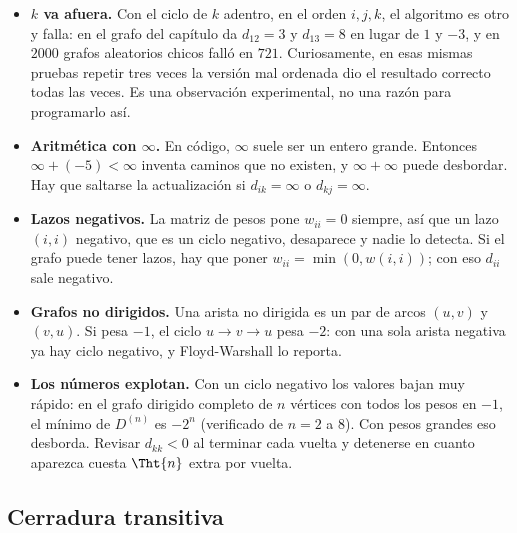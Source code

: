 \documentclass[11pt,letterpaper]{article}
\begin{document}
\begin{ojo}[breakable]
  \begin{itemize}[itemsep=0.2em, leftmargin=1.2em]
    \item \textbf{$k$ va afuera.} Con el ciclo de $k$ adentro, en el
          orden $i, j, k$, el algoritmo es otro y falla: en el grafo
          del capítulo da $d_{12} = 3$ y $d_{13} = 8$ en lugar de $1$
          y $-3$, y en $2000$ grafos aleatorios chicos falló en $721$.
          Curiosamente, en esas mismas pruebas repetir tres veces la
          versión mal ordenada dio el resultado correcto todas las
          veces. Es una observación experimental, no una razón para
          programarlo así.
    \item \textbf{Aritmética con $\infty$.} En código, $\infty$ suele
          ser un entero grande. Entonces $\infty + (-5) < \infty$
          inventa caminos que no existen, y $\infty + \infty$ puede
          desbordar. Hay que saltarse la actualización si
          $d_{ik} = \infty$ o $d_{kj} = \infty$.
    \item \textbf{Lazos negativos.} La matriz de pesos pone
          $w_{ii} = 0$ siempre, así que un lazo $(i, i)$ negativo, que
          es un ciclo negativo, desaparece y nadie lo detecta. Si el
          grafo puede tener lazos, hay que poner
          $w_{ii} = \min(0, w(i, i))$; con eso $d_{ii}$ sale negativo.
    \item \textbf{Grafos no dirigidos.} Una arista no dirigida es un
          par de arcos $(u, v)$ y $(v, u)$. Si pesa $-1$, el ciclo
          $u \to v \to u$ pesa $-2$: con una sola arista negativa ya
          hay ciclo negativo, y Floyd-Warshall lo reporta.
    \item \textbf{Los números explotan.} Con un ciclo negativo los
          valores bajan muy rápido: en el grafo dirigido completo de
          $n$ vértices con todos los pesos en $-1$, el mínimo de
          $D^{(n)}$ es $-2^n$ (verificado de $n = 2$ a $8$). Con pesos
          grandes eso desborda. Revisar $d_{kk} < 0$ al terminar cada
          vuelta y detenerse en cuanto aparezca cuesta $\Tht{n}$ extra
          por vuelta.
  \end{itemize}
\end{ojo}


\subsection*{Cerradura transitiva}
\end{document}
